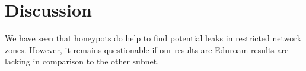 \begin{figure}
    
\end{figure}

\begin{figure}
    
\end{figure}

\section{Discussion}

We have seen that honeypots do help to find potential leaks in restricted network zones.
However, it remains questionable if our results are 
Eduroam results are lacking in comparison to the other subnet.
